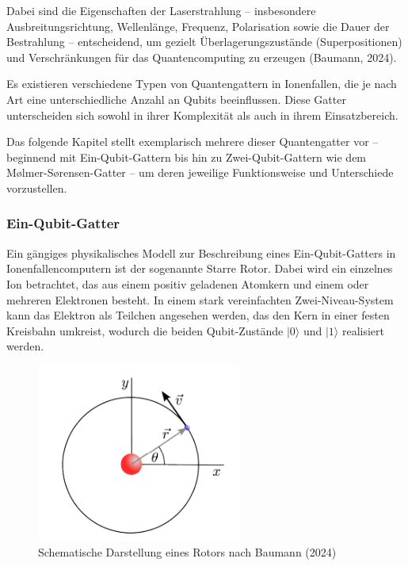Dabei sind die Eigenschaften der Laserstrahlung – insbesondere Ausbreitungsrichtung, Wellenlänge, Frequenz, Polarisation sowie die Dauer der Bestrahlung – entscheidend, um gezielt Überlagerungszustände (Superpositionen) und Verschränkungen für das Quantencomputing zu erzeugen (Baumann, 2024). 

Es existieren verschiedene Typen von Quantengattern in Ionenfallen, die je nach Art eine unterschiedliche Anzahl an Qubits beeinflussen. Diese Gatter unterscheiden sich sowohl in ihrer Komplexität als auch in ihrem Einsatzbereich.

Das folgende Kapitel stellt exemplarisch mehrere dieser Quantengatter vor – beginnend mit Ein-Qubit-Gattern bis hin zu Zwei-Qubit-Gattern wie dem Mølmer-Sørensen-Gatter – um deren jeweilige Funktionsweise und Unterschiede vorzustellen.

\subsubsection{Ein-Qubit-Gatter}

Ein gängiges physikalisches Modell zur Beschreibung eines Ein-Qubit-Gatters in Ionenfallencomputern ist der sogenannte \glqq Starre Rotor\grqq. Dabei wird ein einzelnes Ion betrachtet, das aus einem positiv geladenen Atomkern und einem oder mehreren Elektronen besteht. In einem stark vereinfachten Zwei-Niveau-System kann das Elektron als Teilchen angesehen werden, das den Kern in einer festen Kreisbahn umkreist, wodurch die beiden Qubit-Zustände \( \lvert 0 \rangle \) und \( \lvert 1 \rangle \) realisiert werden.

\begin{figure}[ht]
    \centering
    \includegraphics[width=0.6\textwidth]{images/quanten-hardware/Rotor.png}
    \caption{Schematische Darstellung eines Rotors nach Baumann (2024)}
    \label{fig:meinbild}
\end{figure}

